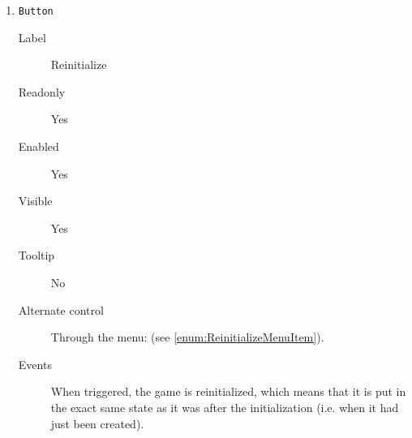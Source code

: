 \begin{enumerate}
    \item \texttt{Button}
              \begin{description}
                  \item[Label] Reinitialize
                  \item[Readonly] Yes
                  \item[Enabled] Yes
                  \item[Visible] Yes
                  \item[Tooltip] No
                  \item[Alternate control] \label{enum:ReinitializeButton} Through the
                                           menu: 
                                           (see \cref{enum:ReinitializeMenuItem}).
                  \item[Events] When triggered, the game is reinitialized, which
                                means that it is put in the exact same state as
                                it was after the initialization (i.e. when it had
                                just been created).
              \end{description}

\end{enumerate}

